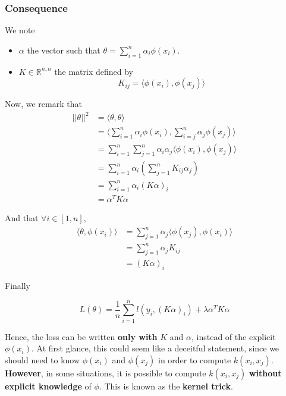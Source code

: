 \documentclass[
10pt, %
a4paper, %
oneside, %
headinclude,footinclude, %
BCOR5mm, %
]{scrartcl}
\begin{document}
\subsubsection{\large\color{Periwinkle}Consequence}

We note
\begin{itemize}
    \item $\alpha$ the vector such that $\theta = \sum^{n}_{i=1} \alpha_i\phi(x_i)$.
    \item $K\in \mathbb{R}^{n ,n}$ the matrix defined by
	\begin{equation}
	    K_{ij} = \langle\phi(x_i), \phi(x_j) \rangle 
	\end{equation}
\end{itemize}

Now, we remark that
\begin{equation*}
    \begin{aligned}
	||\theta||^2&= \langle\theta, \theta \rangle\\
	&= \langle \sum^{n}_{i=1} \alpha_i\phi(x_i) , \sum^{n}_{i=j} \alpha_j\phi(x_j)\rangle\\
	&= \sum^{n}_{i=1} \sum^{n}_{j=1} \alpha_i\alpha_j \langle\phi(x_i), \phi(x_j) \rangle\\
	&= \sum^{n}_{i=1} \alpha_i (\sum^{n}_{j=1} K_{ij}\alpha_j)\\
	&= \sum^{n}_{i=1} \alpha_i (K\alpha)_i\\
	&= \alpha^TK\alpha
    \end{aligned}
\end{equation*}

And that $\forall i\in [1, n]$,
\begin{equation*}
    \begin{aligned}
	\langle\theta, \phi(x_i) \rangle&= \sum^{n}_{j=1} \alpha_j \langle\phi(x_j),\phi(x_i) \rangle\\
	&= \sum^{n}_{j=1} \alpha_j K_{ij}\\
	&= (K\alpha)_{i}
    \end{aligned}
\end{equation*}

Finally

\begin{equation}
    L(\theta) = \frac{1}{n} \sum^{n}_{i=1} l(y_i, (K\alpha)_i)+\lambda \alpha^TK\alpha
\end{equation}

Hence, the loss can be written \textbf{{only with }} $K$ and $\alpha$, instead of the explicit $\phi(x_i)$. At first glance, this could seem like a deceitful statement, since we should need to know $\phi(x_i)$ and $\phi(x_j)$ in order to compute $k(x_i, x_j)$. \textbf{{However}}, in some situations, it is possible to compute $k(x_i, x_j)$ \textbf{{without explicit knowledge}} of $\phi$. This is known as the \textbf{{kernel trick}}.
\\
\end{document}
